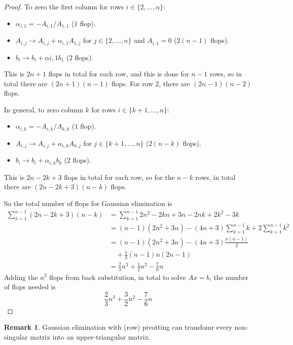 \documentclass[12pt,a4paper]{article}
\theoremstyle{definition}
\newtheorem*{remark}{Remark}
\begin{document}
\begin{proof}
	To zero the first column for rows $i \in \{ 2, \dots, n \}$:
	\begin{itemize}
		\item $\alpha_{i, 1} = -A_{i, 1} / A_{1, 1}$ ($1$ flop).
		\item $A_{i, j} \rightarrow A_{i, j} + \alpha_{i, 1} A_{1, j}$ for $j \in \{ 2, \dots, n \}$ and $A_{i, 1} = 0$ ($2(n - 1)$ flops).
		\item $b_i \rightarrow b_i + \alpha{i, 1} b_1$ ($2$ flops).
	\end{itemize}
	This is $2n + 1$ flops in total for each row, and this is done for $n - 1$ rows, so in total there are $(2n + 1)(n - 1)$ flops. For row $2$, there are $(2n - 1)(n - 2)$ flops.

	In general, to zero column $k$ for rows $i \in \{ k + 1, \dots, n \}$:
	\begin{itemize}
		\item $\alpha_{i, k} = -A_{i, k} / A_{k, k}$ ($1$ flop).
		\item $A_{i, j} \rightarrow A_{i, j} + \alpha_{i, k} A_{k, j}$ for $j \in \{ k + 1, \dots, n \}$ ($2(n - k)$ flops).
		\item $b_i \rightarrow b_i + \alpha_{i, k} b_k$ ($2$ flops).
	\end{itemize}
	This is $2n - 2k + 3$ flops in total for each row, so for the $n - k$ rows, in total there are $(2n - 2k + 3)(n - k)$ flops.

	So the total number of flops for Gaussian elimination is
	\[
		\begin{aligned}
			\sum_{k = 1}^{n - 1} (2n - 2k + 3)(n - k)
				& = \sum_{k = 1}^{n - 1} 2n^2 - 2kn + 3n - 2nk + 2k^2 - 3k \\
				& = (n - 1)(2n^2 + 3n) - (4n + 3) \sum_{k = 1}^{n - 1} k + 2 \sum_{k = 1}^{n - 1} k^2 \\
				& = (n - 1)(2n^2 + 3n) - (4n + 3) \frac{n(n - 1)}{2} \\
				&\quad + \frac{1}{3} (n - 1) n (2n - 1) \\
				& = \frac{2}{3} n^3 + \frac{1}{2} n^2 - \frac{7}{6} n
		\end{aligned}
	\]
	Adding the $n^2$ flops from back substitution, in total to solve $Ax = b$, the number of flops needed is
	\[
		\frac{2}{3} n^3	+ \frac{3}{2} n^2 - \frac{7}{6} n
	\]
\end{proof}

\begin{remark}
	Gaussian elimination with (row) pivotting can transfomr every non-singular matrix into an upper-triangular matrix.
\end{remark}
\end{document}
